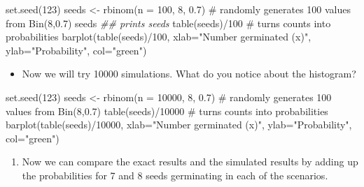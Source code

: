 \documentclass[
  10pt,
  letterpaper,
  DIV=11,
  numbers=noendperiod]{scrartcl}
\newenvironment{Shaded}{\begin{snugshade}}{\end{snugshade}}
\newcommand{\AttributeTok}[1]{\textcolor[rgb]{0.40,0.45,0.13}{#1}}
\newcommand{\CommentTok}[1]{\textcolor[rgb]{0.37,0.37,0.37}{#1}}
\newcommand{\DecValTok}[1]{\textcolor[rgb]{0.68,0.00,0.00}{#1}}
\newcommand{\DocumentationTok}[1]{\textcolor[rgb]{0.37,0.37,0.37}{\textit{#1}}}
\newcommand{\FloatTok}[1]{\textcolor[rgb]{0.68,0.00,0.00}{#1}}
\newcommand{\FunctionTok}[1]{\textcolor[rgb]{0.28,0.35,0.67}{#1}}
\newcommand{\NormalTok}[1]{\textcolor[rgb]{0.00,0.23,0.31}{#1}}
\newcommand{\OtherTok}[1]{\textcolor[rgb]{0.00,0.23,0.31}{#1}}
\newcommand{\SpecialCharTok}[1]{\textcolor[rgb]{0.37,0.37,0.37}{#1}}
\newcommand{\StringTok}[1]{\textcolor[rgb]{0.13,0.47,0.30}{#1}}
\providecommand{\tightlist}{%
  \setlength{\itemsep}{0pt}\setlength{\parskip}{0pt}}\usepackage{longtable,booktabs,array}
\begin{document}
\begin{Shaded}
\begin{Highlighting}[]
\FunctionTok{set.seed}\NormalTok{(}\DecValTok{123}\NormalTok{)}
\NormalTok{seeds }\OtherTok{\textless{}{-}} \FunctionTok{rbinom}\NormalTok{(}\AttributeTok{n =} \DecValTok{100}\NormalTok{, }\DecValTok{8}\NormalTok{, }\FloatTok{0.7}\NormalTok{) }\CommentTok{\# randomly generates 100 values from Bin(8,0.7)}
\NormalTok{seeds }\DocumentationTok{\#\# prints seeds}
\FunctionTok{table}\NormalTok{(seeds)}\SpecialCharTok{/}\DecValTok{100} \CommentTok{\# turns counts into probabilities}
\FunctionTok{barplot}\NormalTok{(}\FunctionTok{table}\NormalTok{(seeds)}\SpecialCharTok{/}\DecValTok{100}\NormalTok{, }\AttributeTok{xlab=}\StringTok{"Number germinated (x)"}\NormalTok{, }\AttributeTok{ylab=}\StringTok{"Probability"}\NormalTok{, }\AttributeTok{col=}\StringTok{"green"}\NormalTok{)}
\end{Highlighting}
\end{Shaded}

\begin{itemize}
\tightlist
\item
  Now we will try 10000 simulations. What do you notice about the
  histogram?
\end{itemize}

\begin{Shaded}
\begin{Highlighting}[]
\FunctionTok{set.seed}\NormalTok{(}\DecValTok{123}\NormalTok{)}
\NormalTok{seeds }\OtherTok{\textless{}{-}} \FunctionTok{rbinom}\NormalTok{(}\AttributeTok{n =} \DecValTok{10000}\NormalTok{, }\DecValTok{8}\NormalTok{, }\FloatTok{0.7}\NormalTok{) }\CommentTok{\# randomly generates 100 values from Bin(8,0.7)}
\FunctionTok{table}\NormalTok{(seeds)}\SpecialCharTok{/}\DecValTok{10000} \CommentTok{\# turns counts into probabilities}
\FunctionTok{barplot}\NormalTok{(}\FunctionTok{table}\NormalTok{(seeds)}\SpecialCharTok{/}\DecValTok{10000}\NormalTok{, }\AttributeTok{xlab=}\StringTok{"Number germinated (x)"}\NormalTok{, }\AttributeTok{ylab=}\StringTok{"Probability"}\NormalTok{, }\AttributeTok{col=}\StringTok{"green"}\NormalTok{)}
\end{Highlighting}
\end{Shaded}

\begin{enumerate}
\def\labelenumi{\arabic{enumi}.}
\setcounter{enumi}{4}
\tightlist
\item
  Now we can compare the exact results and the simulated results by
  adding up the probabilities for 7 and 8 seeds germinating in each of
  the scenarios.
\end{enumerate}
\end{document}
